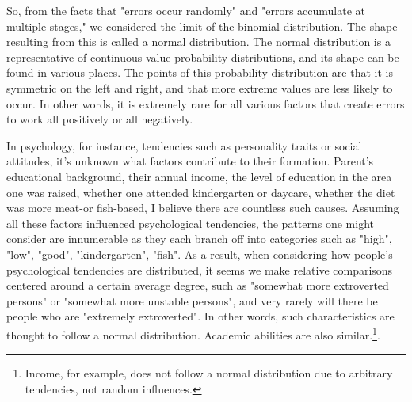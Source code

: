 \documentclass{ltjbook}
\begin{document}
So, from the facts that "errors occur randomly" and "errors accumulate at multiple stages," we considered the limit of the binomial distribution. The shape resulting from this is called a normal distribution. The normal distribution is a representative of continuous value probability distributions, and its shape can be found in various places. The points of this probability distribution are that it is symmetric on the left and right, and that more extreme values are less likely to occur. In other words, it is extremely rare for all various factors that create errors to work all positively or all negatively.

In psychology, for instance, tendencies such as personality traits or social attitudes, it's unknown what factors contribute to their formation. Parent’s educational background, their annual income, the level of education in the area one was raised, whether one attended kindergarten or daycare, whether the diet was more meat-or fish-based, I believe there are countless such causes. Assuming all these factors influenced psychological tendencies, the patterns one might consider are innumerable as they each branch off into categories such as "high", "low", "good", "kindergarten", "fish". As a result, when considering how people's psychological tendencies are distributed, it seems we make relative comparisons centered around a certain average degree, such as "somewhat more extroverted persons" or "somewhat more unstable persons", and very rarely will there be people who are "extremely extroverted". In other words, such characteristics are thought to follow a normal distribution. Academic abilities are also similar.\footnote{Income, for example, does not follow a normal distribution due to arbitrary tendencies, not random influences.}.
\end{document}
